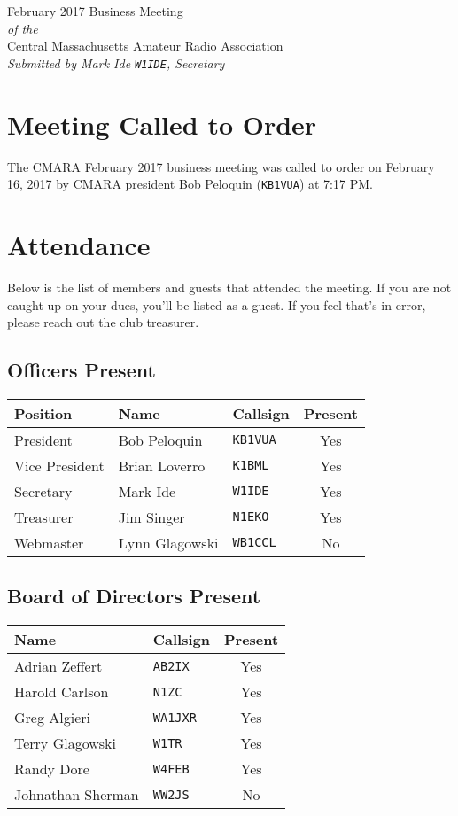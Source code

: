 \documentclass[10pt,letterpaper]{article}
\begin{document}
\begin{center}
{\huge February 2017 Business Meeting}\\
\emph{of the}\\
{\Large Central Massachusetts Amateur Radio Association}\\
\emph{Submitted by Mark Ide \texttt{W1IDE}, Secretary}
\end{center}

\section{Meeting Called to Order}
The CMARA February 2017 business meeting was called to order on February 16, 2017 by CMARA president Bob Peloquin (\texttt{KB1VUA}) at 7:17 PM.

\section{Attendance}
\noindent
Below is the list of members and guests that attended the meeting. If you are not caught up on your dues, you'll be listed as a guest. If you feel that's in error, please reach out the club treasurer.

\subsection{Officers Present}
\begin{tabular}{|l|l|l|c|}
  \hline
  \textbf{Position} & \textbf{Name}  & \textbf{Callsign} & \textbf{Present} \\ \hline
  President         & Bob Peloquin   & \texttt{KB1VUA}   & Yes \\
  Vice President    & Brian Loverro  & \texttt{K1BML}    & Yes \\
  Secretary         & Mark Ide       & \texttt{W1IDE}    & Yes \\
  Treasurer         & Jim Singer     & \texttt{N1EKO}    & Yes \\
  Webmaster         & Lynn Glagowski & \texttt{WB1CCL}   & No  \\
  \hline
\end{tabular}

\subsection{Board of Directors Present}
\begin{tabular}{|l|l|c|}
  \hline
  \textbf{Name}     & \textbf{Callsign} & \textbf{Present} \\ \hline
  Adrian Zeffert    & \texttt{AB2IX}    & Yes \\
  Harold Carlson    & \texttt{N1ZC}     & Yes \\
  Greg Algieri      & \texttt{WA1JXR}   & Yes \\
  Terry Glagowski   & \texttt{W1TR}     & Yes \\
  Randy Dore        & \texttt{W4FEB}    & Yes \\
  Johnathan Sherman & \texttt{WW2JS}    & No  \\
  \hline
\end{tabular}
\end{document}

